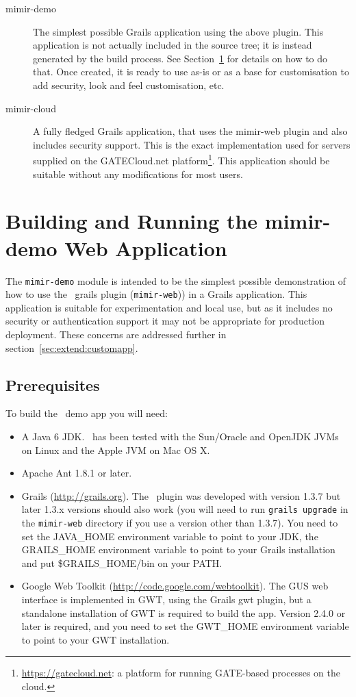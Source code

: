 \begin{description}
\item[mimir-demo] The simplest possible Grails application using the above
plugin. This application is not actually included in the source tree; it is
instead generated by the build process. See Section~\ref{sec:building} for
details on how to do that. Once created, it is ready to use as-is or as a base
for customisation to add security, look and feel customisation, etc.

\item[mimir-cloud] A fully fledged Grails application, that uses the mimir-web
plugin and also includes security support. This is the exact implementation used
for \Mimir{} servers supplied on the GATECloud.net
platform\footnote{\url{https://gatecloud.net}: a platform for running GATE-based
processes on the cloud.}. This application should be suitable without any
modifications for most users.
\end{description}

\section{Building and Running the mimir-demo Web
Application}\label{sec:building}

The {\tt mimir-demo} module is intended to be the simplest possible
demonstration of how to use the \Mimir\ grails plugin ({\tt mimir-web})) in a
Grails application. This application is suitable for experimentation and local
use, but as it includes no security or authentication support it may not be
appropriate for production deployment.  These concerns are addressed further in
section~\ref{sec:extend:customapp}.

\subsection{Prerequisites}

To build the \Mimir\ demo app you will need:
\begin{itemize}
\item A Java 6 JDK.  \Mimir\ has been tested with the Sun/Oracle and OpenJDK
  JVMs on Linux and the Apple JVM on Mac OS X.
\item Apache Ant 1.8.1 or later.
\item Grails (\url{http://grails.org}).  The \Mimir\ plugin was developed with
version 1.3.7 but later 1.3.x versions should also work (you will need to run
{\tt grails upgrade} in the {\tt mimir-web} directory if you use a version other
than 1.3.7).  You need to set the JAVA\_HOME environment variable to point to
your JDK, the GRAILS\_HOME environment variable to point to your Grails
installation and put \$GRAILS\_HOME/bin on your PATH. 
\item Google Web Toolkit (\url{http://code.google.com/webtoolkit}).  The GUS
  web interface is implemented in GWT, using the Grails gwt plugin, but a
  standalone installation of GWT is required to build the app.  Version 2.4.0
  or later is required, and you need to set the GWT\_HOME environment
  variable to point to your GWT installation.
\end{itemize}

